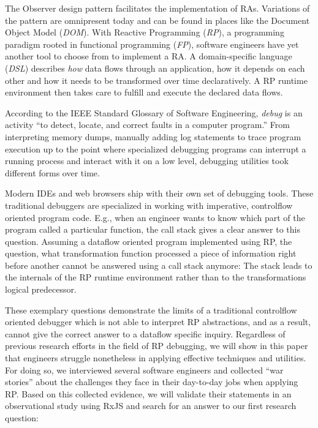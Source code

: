 \documentclass[12pt,a4paper]{article}
\begin{document}
The Observer design pattern\cite{gamma1995design} facilitates the implementation of RAs. Variations of the pattern are omnipresent today and can be found in places like the Document Object Model (\emph{DOM})\cite{alabor:2019:reactiveappllications}. With Reactive Programming (\emph{RP}), a programming paradigm rooted in functional programming (\emph{FP}), software engineers have yet another tool to choose from to implement a RA. A domain-specific language (\emph{DSL}) describes \emph{how} data flows through an application, how it depends on each other and how it needs to be transformed over time declaratively. A RP runtime environment then takes care to fulfill and execute the declared data flows\cite{10.1145/2501654.2501666}.

According to the IEEE Standard Glossary of Software Engineering, \emph{debug} is an activity ``to detect, locate, and correct faults in a computer program.''\cite{ieeeglossary} From interpreting memory dumps, manually adding log statements to trace program execution up to the point where specialized debugging programs can interrupt a running process and interact with it on a low level, debugging utilities took different forms over time.

Modern IDEs and web browsers ship with their own set of debugging tools. These traditional debuggers are specialized in working with imperative, controlflow oriented program code. E.g., when an engineer wants to know which part of the program called a particular function, the call stack gives a clear answer to this question. Assuming a dataflow oriented program implemented using RP, the question, what transformation function processed a piece of information right before another cannot be answered using a call stack anymore: The stack leads to the internals of the RP runtime environment rather than to the transformations logical predecessor.

These exemplary questions demonstrate the limits of a traditional controlflow oriented debugger which is not able to interpret RP abstractions, and as a result, cannot give the correct answer to a dataflow specific inquiry. Regardless of previous research efforts \cite{10.1145/2577080.2577083} \cite{10.1145/2884781.2884815} \cite{10.1145/3180155.3180156} in the field of RP debugging, we will show in this paper that engineers struggle nonetheless in applying effective techniques and utilities. For doing so, we interviewed several software engineers and collected ``war stories'' about the challenges they face in their day-to-day jobs when applying RP. Based on this collected evidence, we will validate their statements in an observational study using RxJS and search for an answer to our first research question:
\end{document}
